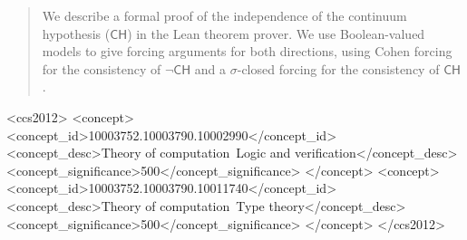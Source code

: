 \documentclass[sigplan,screen]{acmart}
\theoremstyle{definition}
\begin{document}
\begin{abstract}
  We describe a formal proof of the independence of the continuum hypothesis (\(\mathsf{CH}\)) in the Lean theorem prover. We use Boolean-valued models to give forcing arguments for both directions, using Cohen forcing for the consistency of \(\neg \mathsf{CH}\) and a \(\sigma\)-closed forcing for the consistency of \(\mathsf{CH}\).
\end{abstract}





\begin{CCSXML}
<ccs2012>
<concept>
<concept_id>10003752.10003790.10002990</concept_id>
<concept_desc>Theory of computation~Logic and verification</concept_desc>
<concept_significance>500</concept_significance>
</concept>
<concept>
<concept_id>10003752.10003790.10011740</concept_id>
<concept_desc>Theory of computation~Type theory</concept_desc>
<concept_significance>500</concept_significance>
</concept>
</ccs2012>
\end{CCSXML}

\end{document}
